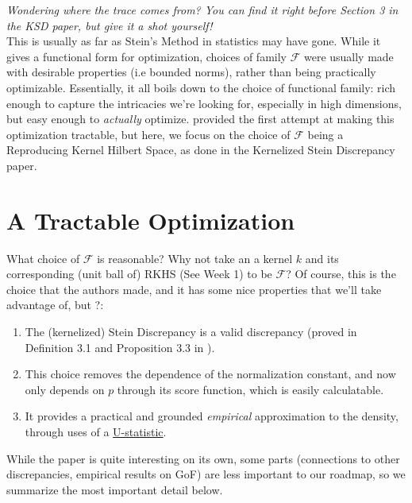 \documentclass[12pt]{article}
\begin{document}
\noindent \textit{Wondering where the trace comes from? You can find it right before Section 3 in the KSD paper, but give it a shot yourself!} \\

\noindent This is usually as far as Stein's Method in statistics may have gone. While it gives a functional form for optimization, choices of family $\mathcal{F}$ were usually made with desirable properties (i.e bounded norms), rather than being practically optimizable. Essentially, it all boils down to the choice of functional family: rich enough to capture the intricacies we're looking for, especially in high dimensions, but easy enough to \textit{actually} optimize. \cite{gorham2015measuring} provided the first attempt at making this optimization tractable, but here, we focus on the choice of $\mathcal{F}$ being a Reproducing Kernel Hilbert Space, as done in the Kernelized Stein Discrepancy paper.

\section{A Tractable Optimization}

What choice of $\mathcal{F}$ is reasonable? Why not take an a kernel $k$ and its corresponding (unit ball of) RKHS (See Week 1) to be $\mathcal{F}$? Of course, this is the choice that the authors made, and it has some nice properties that we'll take advantage of, but ?:

\begin{enumerate}
    \item The (kernelized) Stein Discrepancy is a valid discrepancy (proved in Definition 3.1 and Proposition 3.3 in \cite{liu2016kernelized}).
    \item This choice removes the dependence of the normalization constant, and now only depends on $p$ through its score function, which is easily calculatable.
    \item It provides a practical and grounded \textit{empirical} approximation to the density, through uses of a \href{https://en.wikipedia.org/wiki/U-statistic}{U-statistic}. 
\end{enumerate}

\noindent While the paper is quite interesting on its own, some parts (connections to other discrepancies, empirical results on GoF) are less important to our roadmap, so we summarize the most important detail below. \\ 
\end{document}
